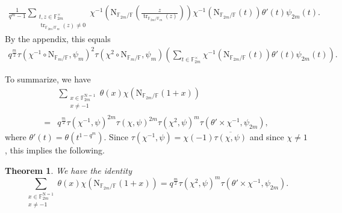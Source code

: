\documentclass[12pt, reqno]{amsart}
\newtheorem{theorem}{Theorem}[section]
\theoremstyle{definition}
\theoremstyle{definition}
\theoremstyle{definition}
\newcommand{\multiplicativegroup}[1]{#1^{\times}}
\newcommand{\conjugate}[1]{\overline{#1}}
\newcommand{\fieldCharacter}{\psi}
\newcommand{\trace}{\operatorname{tr}}
\newcommand{\aFieldNorm}{\mathrm{N}}
\newcommand{\finiteField}{\mathbb{F}}
\newcommand{\finiteFieldExtension}[1]{\finiteField_{#1}}
\newcommand{\NormOneGroup}[1]{\finiteFieldExtension{#1}^{\aFieldNorm = 1}}
\begin{document}
\begin{align*}
	\frac{1}{q^m-1}\sum_{\substack{t,z \in \multiplicativegroup{\finiteFieldExtension{2m}}\\
			\trace_{\finiteFieldExtension{2m} \slash \finiteFieldExtension{m}}\left(z\right) \ne 0}} \chi^{-1}\left(\aFieldNorm_{\finiteFieldExtension{2m} \slash \finiteField}\left(\frac{z}{\trace_{\finiteFieldExtension{2m} \slash \finiteFieldExtension{m}}\left(z\right) }\right)\right) \chi^{-1}\left(\aFieldNorm_{\finiteFieldExtension{2m} \slash \finiteField}\left(t\right)\right) \theta' \left(t\right) \fieldCharacter_{2m}\left(t\right).
\end{align*}
By the appendix, this equals
\begin{align*}
	q^{\frac{m}{2}} \tau\left(\chi^{-1} \circ \aFieldNorm_{\finiteFieldExtension{m} \slash \finiteField}, \fieldCharacter_m\right)^2 \tau\left(\chi^{2} \circ \aFieldNorm_{\finiteFieldExtension{m} \slash \finiteField}, \fieldCharacter_m\right) \left(\sum_{t \in \multiplicativegroup{\finiteFieldExtension{2m}}} \chi^{-1}\left(\aFieldNorm_{\finiteFieldExtension{2m} \slash \finiteField}\left(t\right)\right) \theta' \left(t\right) \fieldCharacter_{2m}\left(t\right)\right).
\end{align*}

To summarize, we have
\begin{align*}
	& \sum_{\substack{x \in \NormOneGroup{2m}\\
			x \ne -1}} \theta \left(x\right) \chi\left(\aFieldNorm_{\finiteFieldExtension{2m} \slash \finiteField}\left(1 + x\right)\right) \\
		=& q^{\frac{m}{2}} \tau\left(\chi^{-1}, \fieldCharacter\right)^{2m} \tau\left(\chi, \fieldCharacter\right)^{2m} \tau\left(\chi^{2}, \fieldCharacter\right)^m \tau\left(\theta' \times \chi^{-1}, \fieldCharacter_{2m}\right),
\end{align*}
where $\theta'\left(t\right) = \theta\left(t^{1-q^m}\right)$.
Since $\tau\left(\chi^{-1}, \fieldCharacter\right) = \chi\left(-1\right) \conjugate{\tau\left(\chi, \fieldCharacter\right)}$ and since $\chi \ne 1$, this implies the following. \begin{theorem}
	We have the identity $$\sum_{\substack{x \in \NormOneGroup{2m}\\
			x \ne -1}} \theta \left(x\right) \chi\left(\aFieldNorm_{\finiteFieldExtension{2m} \slash \finiteField}\left(1 + x\right)\right) = q^{\frac{m}{2}} \tau\left(\chi^{2}, \fieldCharacter\right)^m \tau\left(\theta' \times \chi^{-1}, \fieldCharacter_{2m}\right).$$
\end{theorem}
\end{document}
